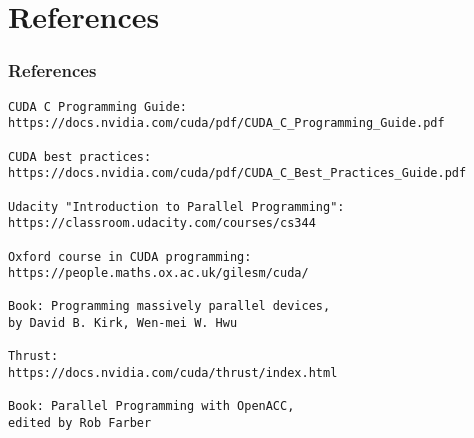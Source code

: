 \section{References}
\begin{frame}[fragile]
  \frametitle{References}
{\tiny
\begin{verbatim}
CUDA C Programming Guide:
https://docs.nvidia.com/cuda/pdf/CUDA_C_Programming_Guide.pdf

CUDA best practices:
https://docs.nvidia.com/cuda/pdf/CUDA_C_Best_Practices_Guide.pdf

Udacity "Introduction to Parallel Programming":
https://classroom.udacity.com/courses/cs344

Oxford course in CUDA programming:
https://people.maths.ox.ac.uk/gilesm/cuda/

Book: Programming massively parallel devices, 
by David B. Kirk, Wen-mei W. Hwu 

Thrust:
https://docs.nvidia.com/cuda/thrust/index.html

Book: Parallel Programming with OpenACC,
edited by Rob Farber
\end{verbatim}
}

\end{frame}

